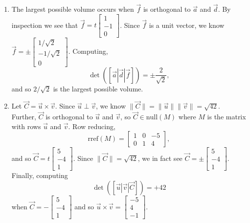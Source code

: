 \documentclass[red]{tutorial}
\newcommand{\mat}[1]{\begin{bmatrix}#1\end{bmatrix}}
\theoremstyle{definition}
\theoremstyle{theorem}
\begin{document}
\begin{solutions}
\begin{enumerate}
			\item The largest possible volume occurs when $\vec f$ is orthogonal to $\vec a$ and $\vec d$.
				By inspection we see that $\vec f=t\mat{1\\-1\\0}$. Since $\vec f$ is a unit vector, we know
				$\vec f=\pm\mat{1/\sqrt{2}\\-1/\sqrt{2}\\0}$. Computing,
				\[
					\det([\vec a|\vec d|\vec f]) = \pm \frac{2}{\sqrt{2}},
				\]
				and so $2/\sqrt{2}$ is the largest possible volume.
			\item Let $\vec C=\vec u\times \vec v$. Since $\vec u\perp \vec v$, we know $\|\vec C\|=\|\vec u\|\|\vec v\|=\sqrt{42}$.
				Further, $\vec C$ is orthogonal to $\vec u$ and $\vec v$, so $\vec C\in \text{null}(M)$ where $M$ is the matrix
				with rows $\vec u$ and $\vec v$. Row reducing,
				\[
					\text{rref}(M) = \mat{1&0&-5\\0&1&4},
				\]
				and so $\vec C=t\mat{5\\-4\\1}$. Since $\|\vec C\|=\sqrt{42}$, we in fact see $\vec C=\pm \mat{5\\-4\\1}$. Finally,
				computing
				\[
					\det([\vec u|\vec v|\vec C]) = +42
				\]
				when $\vec C=-\mat{5\\-4\\1}$ and so $\vec u\times \vec v = \mat{-5\\4\\-1}$.
		\end{enumerate}
	\end{solutions}
\end{document}

